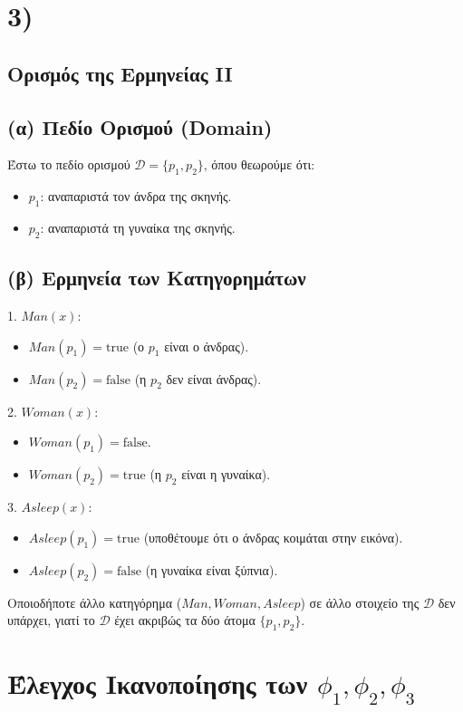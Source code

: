 \documentclass[a4paper,12pt]{article}
\begin{document}
\section*{3)}


\subsection*{Ορισμός της Ερμηνείας II}

\subsection*{(α) Πεδίο Ορισμού (Domain)}
Έστω το πεδίο ορισμού \(\mathcal{D} = \{ p_1, p_2\}\), όπου θεωρούμε ότι:
\begin{itemize}
    \item \(p_1\): αναπαριστά τον άνδρα της σκηνής.
    \item \(p_2\): αναπαριστά τη γυναίκα της σκηνής.
\end{itemize}

\subsection*{(β) Ερμηνεία των Κατηγορημάτων}
1. \(Man(x):\)
\begin{itemize}
    \item \(Man(p_1) = \text{true}\) (ο \(p_1\) είναι ο άνδρας).
    \item \(Man(p_2) = \text{false}\) (η \(p_2\) δεν είναι άνδρας).
\end{itemize}
2. \(Woman(x):\)
\begin{itemize}
    \item \(Woman(p_1) = \text{false}\).
    \item \(Woman(p_2) = \text{true}\) (η \(p_2\) είναι η γυναίκα).
\end{itemize}
3. \(Asleep(x):\)
\begin{itemize}
    \item \(Asleep(p_1) = \text{true}\) (υποθέτουμε ότι ο άνδρας κοιμάται στην εικόνα).
    \item \(Asleep(p_2) = \text{false}\) (η γυναίκα είναι ξύπνια).
\end{itemize}
Οποιοδήποτε άλλο κατηγόρημα (\(Man, Woman, Asleep\)) σε άλλο στοιχείο της \(\mathcal{D}\) δεν υπάρχει, γιατί το \(\mathcal{D}\) έχει ακριβώς τα δύο άτομα \(\{p_1, p_2\}\).

\section*{Έλεγχος Ικανοποίησης των \(\phi_1, \phi_2, \phi_3\)}
\end{document}
